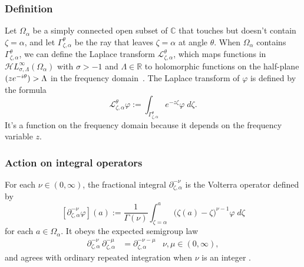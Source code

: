 \documentclass{article}
\theoremstyle{plain}
\newcommand{\R}{\mathbb{R}}
\newcommand{\C}{\mathbb{C}}
\let\Re\relax
\DeclareMathOperator{\Re}{Re}
\newcommand{\laplace}{\mathcal{L}}
\newcommand{\fracderiv}[3]{\partial^{#1}_{#2, #3}}
\newcommand{\singexp}[2]{\mathcal{H}L^\infty_{#1, #2}}
\newcommand{\domain}{\Omega}
\begin{document}
\subsubsection{Definition}
Let $\domain_\alpha$ be a simply connected open subset of $\C$ that touches but doesn't contain $\zeta=\alpha$, and let $\Gamma_{\zeta, \alpha}^\theta$ be the ray that leaves $\zeta=\alpha$ at angle $\theta$. When $\domain_\alpha$ contains $\Gamma_{\zeta, \alpha}^\theta$, we can define the Laplace transform $\laplace_{\zeta, \alpha}^{\theta}$, which maps functions in $\singexp{\sigma}{\Lambda}(\domain_\alpha)$ with $\sigma>-1$ and $\Lambda\in\R$ to holomorphic functions on the half-plane $\Re(z e^{-i\theta}) > \Lambda$ in the frequency domain~\cite[Section 5.6]{diverg-resurg-i}. The Laplace transform of $\varphi$ is defined by the formula
\begin{equation}\label{laplace:int} 
\laplace_{\zeta, \alpha}^{\theta} \varphi := \int_{\Gamma_{\zeta,\alpha}^\theta} e^{-z\zeta} \varphi\;d\zeta.
\end{equation}
It's a function on the frequency domain because it depends on the frequency variable $z$.
\subsubsection{Action on integral operators}\label{sec:L-int-op}
For each $\nu \in (0, \infty)$, the fractional integral $\partial^{-\nu}_{\zeta, \alpha}$ is the Volterra operator defined by
\[ [\partial^{-\nu}_{\zeta, \alpha} \varphi](a) := \frac{1}{\Gamma(\nu)} \int_{\zeta = \alpha}^a \big(\zeta(a)-\zeta\big)^{\nu-1} \varphi\;d\zeta \]
for each $a \in \domain_\alpha$. It obeys the expected semigroup law \cite[Section~1.3]{mladenov2014advanced}
\begin{align*}
\fracderiv{-\nu}{\zeta}{\alpha}\,\fracderiv{-\mu}{\zeta}{\alpha} & = \fracderiv{-\nu-\mu}{\zeta}{\alpha} & \nu, \mu \in (0, \infty),
\end{align*}
and agrees with ordinary repeated integration when $\nu$ is an integer \cite[Equation~35]{mladenov2014advanced}.
\end{document}
